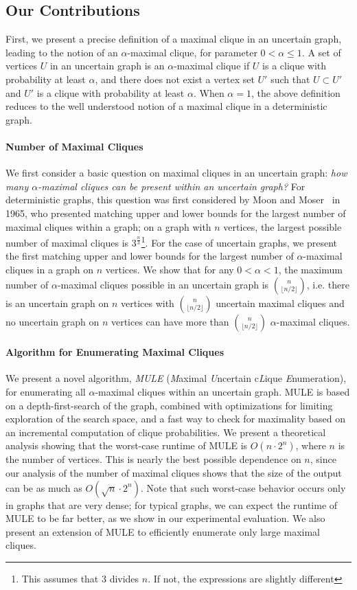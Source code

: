 \documentclass[11pt,letterpaper]{article}
\begin{document}
\subsection{Our Contributions}
First, we present a precise definition of a maximal clique in an uncertain graph, leading to the notion of an $\alpha$-maximal clique, for parameter $0 < \alpha \le 1$. A set of vertices $U$ in an uncertain graph is an $\alpha$-maximal clique if $U$ is a clique with probability at least $\alpha$, and there does not exist a vertex set $U'$ such that $U \subset U'$ and $U'$ is a clique with probability at least $\alpha$. When $\alpha=1$, the above definition reduces to the well understood notion of a maximal clique in a deterministic graph.

\paragraph{Number of Maximal Cliques}
We first consider a basic question on maximal cliques in an uncertain graph: {\em how many $\alpha$-maximal cliques can be present within an uncertain graph?} For deterministic graphs, this question was first considered by Moon and Moser~\cite{MM65} in 1965, who presented matching upper and lower bounds for the largest number of maximal cliques within a graph; on a graph with $n$ vertices, the largest possible number of maximal cliques is $3^{\frac{n}{3}}$\footnote{This assumes that $3$ divides $n$. If not, the expressions are slightly different}. For the case of uncertain graphs, we present the first matching upper and lower bounds for the largest number of $\alpha$-maximal cliques in a graph on $n$ vertices. We show that for any $0 < \alpha < 1$, the maximum number of $\alpha$-maximal cliques possible in an uncertain graph is $n \choose \lfloor n/2 \rfloor$, i.e.  there is an uncertain graph on $n$ vertices with $n \choose \lfloor n/2 \rfloor$ uncertain maximal cliques and no uncertain graph on $n$ vertices can have more than $n \choose \lfloor n/2 \rfloor$ $\alpha$-maximal cliques.

\paragraph{Algorithm for Enumerating Maximal Cliques}
We present a novel algorithm, {\em MULE} ({\em M}aximal {\em U}ncertain c{\em L}ique {\em E}numeration), for enumerating all $\alpha$-maximal cliques within an uncertain graph. MULE is based on a depth-first-search of the graph, combined with optimizations for limiting exploration of the search space, and a fast way to check for maximality based on an incremental computation of clique probabilities. We present a theoretical analysis showing that the worst-case runtime of MULE is $O(n \cdot 2^{n})$, where $n$ is the number of vertices. This is nearly the best possible dependence on $n$, since our analysis of the number of maximal cliques shows that the size of the output can be as much as $O(\sqrt{n} \cdot 2^{n})$. Note that such worst-case behavior occurs only in graphs that are very dense; for typical graphs, we can expect the runtime of MULE to be far better, as we show in our experimental evaluation. We also present an extension of MULE to efficiently enumerate only large maximal cliques. 
\end{document}
